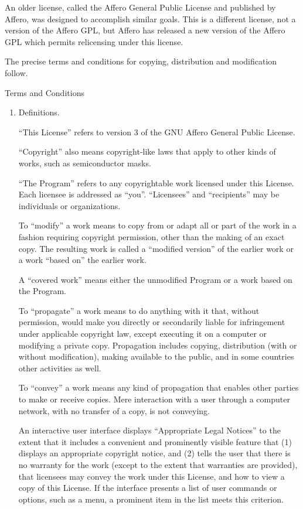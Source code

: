 \documentclass{article}%
\begin{document}
\begin{flushleft}
An older license, called the Affero General Public License and
published by Affero, was designed to accomplish similar goals. This is
a different license, not a version of the Affero GPL, but Affero has
released a new version of the Affero GPL which permits relicensing under
this license.

The precise terms and conditions for copying, distribution and
modification follow.

\begin{center}
{\Large Terms and Conditions}
\end{center}

\begin{enumerate}

\addtocounter{enumi}{-1}

\item Definitions.

``This License'' refers to version 3 of the GNU Affero General Public License.

``Copyright'' also means copyright-like laws that apply to other kinds of
works, such as semiconductor masks.

``The Program'' refers to any copyrightable work licensed under this
License. Each licensee is addressed as ``you''. ``Licensees'' and
``recipients'' may be individuals or organizations.

To ``modify'' a work means to copy from or adapt all or part of the work
in a fashion requiring copyright permission, other than the making of an
exact copy.  The resulting work is called a ``modified version'' of the
earlier work or a work ``based on'' the earlier work.

A ``covered work'' means either the unmodified Program or a work based
on the Program.

To ``propagate'' a work means to do anything with it that, without
permission, would make you directly or secondarily liable for
infringement under applicable copyright law, except executing it on a
computer or modifying a private copy.  Propagation includes copying,
distribution (with or without modification), making available to the
public, and in some countries other activities as well.

To ``convey'' a work means any kind of propagation that enables other
parties to make or receive copies. Mere interaction with a user through
a computer network, with no transfer of a copy, is not conveying.

An interactive user interface displays ``Appropriate Legal Notices''
to the extent that it includes a convenient and prominently visible
feature that (1) displays an appropriate copyright notice, and (2)
tells the user that there is no warranty for the work (except to the
extent that warranties are provided), that licensees may convey the
work under this License, and how to view a copy of this License. If
the interface presents a list of user commands or options, such as a
menu, a prominent item in the list meets this criterion.


\end{enumerate}
\end{flushleft}
\end{document}
